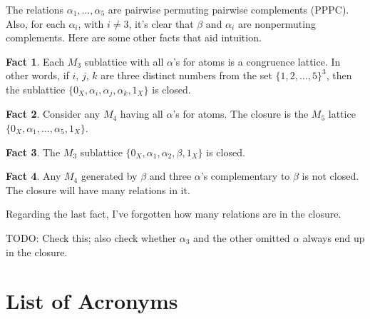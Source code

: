 \documentclass{amsart}
\theoremstyle{plain}
\theoremstyle{definition}
\newtheorem{fact}{Fact}[section]
\theoremstyle{definition}
\numberwithin{equation}{section}
\newcommand{\<}{\ensuremath{\langle}}
\renewcommand{\>}{\ensuremath{\rangle}}
\begin{document}
The relations $\alpha_1, \dots, \alpha_5$ are pairwise
permuting pairwise complements (\acs{PPPC}).  Also, for 
each $\alpha_i$, with $i\neq 3$, it's clear that $\beta$ and $\alpha_i$ are
nonpermuting complements.
Here are some other facts that aid intuition.
\begin{fact}
  Each $M_3$ sublattice with all $\alpha$'s for atoms is a congruence lattice.  In
  other words, if $i$, $j$, $k$ are three distinct numbers from  the set 
  $\{1,2,\dots, 5\}^3$, then the sublattice $\{0_X, \alpha_i, \alpha_j,
  \alpha_k, 1_X\}$ is closed. 
\end{fact}
\begin{fact}
Consider any $M_4$ having all $\alpha$'s for atoms.  The closure is the $M_5$
lattice $\{0_X, \alpha_1, \dots, \alpha_5, 1_X\}$.
\end{fact}
\begin{fact}
  The $M_3$ sublattice $\{0_X, \alpha_1, \alpha_2, \beta, 1_X\}$ is closed.
\end{fact}
\begin{fact}
  Any $M_4$ generated by $\beta$ and three $\alpha$'s complementary to
  $\beta$ is not closed.  The closure will have many relations in it.
\end{fact}
Regarding the last fact, I've forgotten how many relations are in the closure.

TODO: Check this; also check whether $\alpha_3$ and the other omitted $\alpha$
  always end up in the closure.

\section{List of Acronyms}
\begin{acronym}
\end{acronym}




\end{document}

